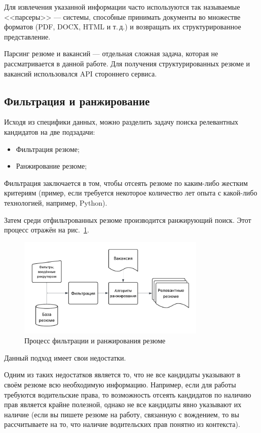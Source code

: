 \documentclass[14pt]{mmcs_article}
\begin{document}
Для извлечения указанной информации часто используются так называемые <<парсеры>> --- системы, способные принимать документы во множестве форматов (PDF, DOCX, HTML и т.\,д.) и возвращать их структурированное представление.

Парсинг резюме и вакансий --- отдельная сложная задача, которая не рассматривается в данной работе. Для получения структурированных резюме и вакансий использовался API стороннего сервиса.

\subsection{Фильтрация и ранжирование}

Исходя из специфики данных, можно разделить задачу поиска релевантных кандидатов на две подзадачи:

\begin{itemize}
  \item Фильтрация резюме;
  \item Ранжирование резюме;
\end{itemize}

Фильтрация заключается в том, чтобы отсеять резюме по каким-либо жестким критериям (пример, если требуется некоторое количество лет опыта с какой-либо технологией, например, Python).

Затем среди отфильтрованных резюме производится ранжирующий поиск. Этот процесс отражён на рис.~\ref{fig:filtering_and_ranking}.

\begin{figure}[h]
  \centering
  \includegraphics[width=0.8\textwidth]{plots/filtering_and_ranking.pdf}
  \caption{Процесс фильтрации и ранжирования резюме}
  \label{fig:filtering_and_ranking}
\end{figure}

Данный подход имеет свои недостатки.

Одним из таких недостатков является то, что не все кандидаты указывают в своём резюме всю необходимую информацию. Например, если для работы требуются водительские права, то возможность отсеять кандидатов по наличию прав является крайне полезной, однако не все кандидаты явно указывают их наличие (если вы пишете резюме на работу, связанную с вождением, то вы рассчитываете на то, что наличие водительских прав понятно из контекста).
\end{document}
